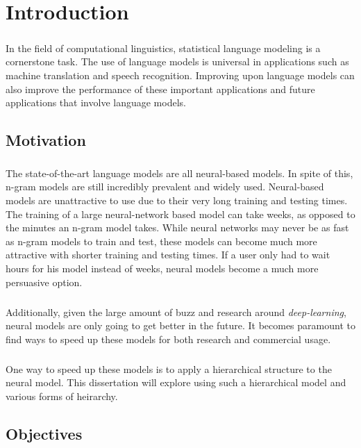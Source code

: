 
\chapter{Introduction}
\paragraph{}
In the field of computational linguistics, statistical language modeling is a cornerstone task. The use of language models  is universal in applications such as machine translation and speech recognition.  Improving upon language models can also improve the performance of these important applications and future applications that involve language models.
\section{Motivation}
\paragraph{}
The state-of-the-art language models are all neural-based models. In spite of this, n-gram models are still incredibly prevalent and widely used. Neural-based models are unattractive to use due to their very long training and testing times. The training of a large neural-network based model can take weeks, as opposed to the minutes an n-gram model takes. While neural networks may never be as fast as n-gram models to train and test, these models can become much more attractive with shorter training and testing times. If a user only had to wait hours for his model instead of weeks, neural models become a much more persuasive option.
\paragraph{}
Additionally, given the large amount of buzz and research around \emph{deep-learning}, neural models are only going to get better in the future. It becomes paramount to find ways to speed up these models for both research and commercial usage.
\paragraph{}
One way to speed up these models is to apply a hierarchical structure to the neural model. This dissertation will explore using such a hierarchical model and various forms of heirarchy.

\section{Objectives}
